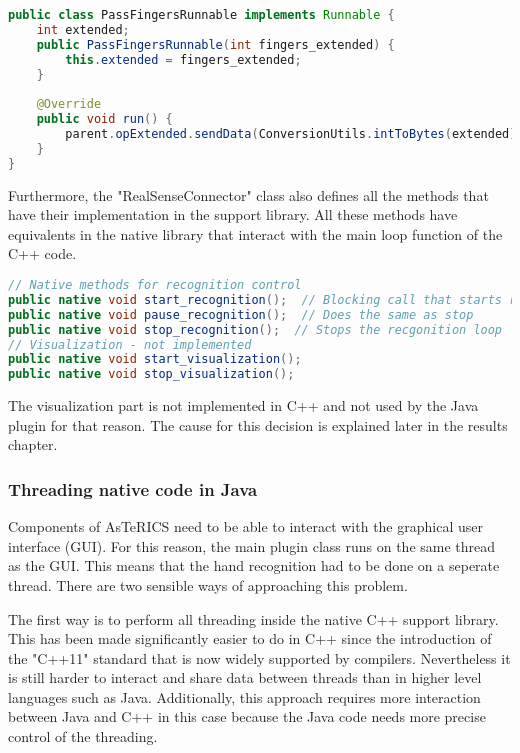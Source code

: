 \documentclass[BSA,Bachelor,english]{twbook}%
\begin{document}
\begin{lstlisting}[language=Java,name={Forwarding runnable},label={rs:javaplugin:5}]
public class PassFingersRunnable implements Runnable {
	int extended;
	public PassFingersRunnable(int fingers_extended) {
		this.extended = fingers_extended;
	}
	
	@Override
	public void run() {
		parent.opExtended.sendData(ConversionUtils.intToBytes(extended));
	}
}
\end{lstlisting}

Furthermore, the "RealSenseConnector" class also defines all the methods that have their implementation in the support library. All these methods have equivalents in the native library that interact with the main loop function of the C++ code.

\begin{lstlisting}[language=Java,name={Java Native Interface methods},label={rs:javaplugin:4}]
// Native methods for recognition control
public native void start_recognition();  // Blocking call that starts recognition loop
public native void pause_recognition();  // Does the same as stop
public native void stop_recognition();  // Stops the recgonition loop
// Visualization - not implemented
public native void start_visualization();
public native void stop_visualization();
\end{lstlisting}

The visualization part is not implemented in C++ and not used by the Java plugin for that reason. The cause for this decision is explained later in the results chapter.

\subsubsection{Threading native code in Java}

Components of AsTeRICS need to be able to interact with the graphical user interface (GUI). For this reason, the main plugin class runs on the same thread as the GUI. This means that the hand recognition had to be done on a seperate thread. There are two sensible ways of approaching this problem.

The first way is to perform all threading inside the native C++ support library. This has been made significantly easier to do in C++ since the introduction of the "C++11" standard that is now widely supported by compilers. Nevertheless it is still harder to interact and share data between threads than in higher level languages such as Java. Additionally, this approach requires more interaction between Java and C++ in this case because the Java code needs more precise control of the threading.
\end{document}
